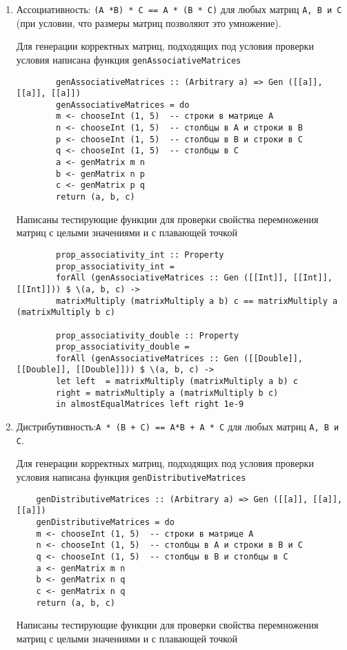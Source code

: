 \documentclass[10pt,a4paper,final]{article} %
\begin{document}
\begin{enumerate}

	\item ﻿﻿Ассоциативность: \texttt{(А *B) * С == А * (В * С)} для любых матриц \texttt{А, В и С} (при условии, что размеры матриц позволяют это умножение).

	Для генерации корректных матриц, подходящих под условия проверки условия написана функция \texttt{genAssociativeMatrices}
	\begin{lstlisting}
		genAssociativeMatrices :: (Arbitrary a) => Gen ([[a]], [[a]], [[a]])
		genAssociativeMatrices = do
		m <- chooseInt (1, 5)  -- строки в матрице A
		n <- chooseInt (1, 5)  -- столбцы в A и строки в B
		p <- chooseInt (1, 5)  -- столбцы в B и строки в C
		q <- chooseInt (1, 5)  -- столбцы в C
		a <- genMatrix m n
		b <- genMatrix n p
		c <- genMatrix p q
		return (a, b, c)
	\end{lstlisting}
	Написаны тестирующие функции для проверки свойства перемножения матриц с целыми значениями  и с плавающей точкой
	
	\begin{lstlisting}
		prop_associativity_int :: Property
		prop_associativity_int =
		forAll (genAssociativeMatrices :: Gen ([[Int]], [[Int]], [[Int]])) $ \(a, b, c) ->
		matrixMultiply (matrixMultiply a b) c == matrixMultiply a (matrixMultiply b c)
		
		prop_associativity_double :: Property
		prop_associativity_double =
		forAll (genAssociativeMatrices :: Gen ([[Double]], [[Double]], [[Double]])) $ \(a, b, c) ->
		let left  = matrixMultiply (matrixMultiply a b) c
		right = matrixMultiply a (matrixMultiply b c)
		in almostEqualMatrices left right 1e-9
	\end{lstlisting}
	

	\item ﻿﻿﻿Дистрибутивность:\texttt{А * (B + C) == А*В + А * С} для любых матриц \texttt{А, В и С}.
	
	Для генерации корректных матриц, подходящих под условия проверки условия написана функция \texttt{genDistributiveMatrices}
	\begin{lstlisting}
	genDistributiveMatrices :: (Arbitrary a) => Gen ([[a]], [[a]], [[a]])
	genDistributiveMatrices = do
	m <- chooseInt (1, 5)  -- строки в матрице A
	n <- chooseInt (1, 5)  -- столбцы в A и строки в В и С
	q <- chooseInt (1, 5)  -- столбцы в В и столбцы в С
	a <- genMatrix m n
	b <- genMatrix n q
	c <- genMatrix n q
	return (a, b, c)
	\end{lstlisting}
	Написаны тестирующие функции для проверки свойства перемножения матриц с целыми значениями  и с плавающей точкой
	

\end{enumerate}
\end{document}
